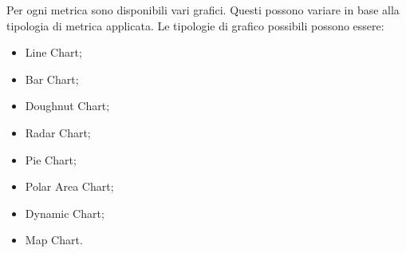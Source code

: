 			Per ogni metrica sono disponibili vari grafici. Questi possono variare in base alla tipologia di metrica applicata.\newline
			Le tipologie di grafico possibili possono essere:
			\begin{itemize}
				\item Line Chart;
				\item Bar Chart;
				\item Doughnut Chart;
				\item Radar Chart;
				\item Pie Chart;
				\item Polar Area Chart;
				\item Dynamic Chart;
				\item Map Chart.
			\end{itemize}


		\pagebreak
